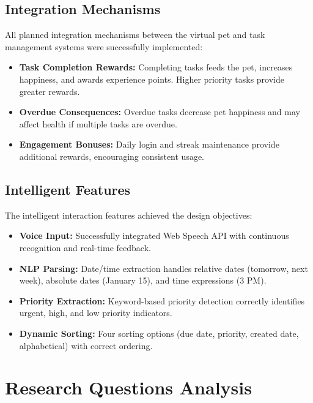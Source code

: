 \subsection{Integration Mechanisms}

All planned integration mechanisms between the virtual pet and task management systems were successfully implemented:

\begin{itemize}
    \item \textbf{Task Completion Rewards:} Completing tasks feeds the pet, increases happiness, and awards experience points. Higher priority tasks provide greater rewards.
    \item \textbf{Overdue Consequences:} Overdue tasks decrease pet happiness and may affect health if multiple tasks are overdue.
    \item \textbf{Engagement Bonuses:} Daily login and streak maintenance provide additional rewards, encouraging consistent usage.
\end{itemize}

\subsection{Intelligent Features}

The intelligent interaction features achieved the design objectives:

\begin{itemize}
    \item \textbf{Voice Input:} Successfully integrated Web Speech API with continuous recognition and real-time feedback.
    \item \textbf{NLP Parsing:} Date/time extraction handles relative dates (tomorrow, next week), absolute dates (January 15), and time expressions (3 PM).
    \item \textbf{Priority Extraction:} Keyword-based priority detection correctly identifies urgent, high, and low priority indicators.
    \item \textbf{Dynamic Sorting:} Four sorting options (due date, priority, created date, alphabetical) with correct ordering.
\end{itemize}

\section{Research Questions Analysis}
\label{sec:rq-analysis}

\completed

